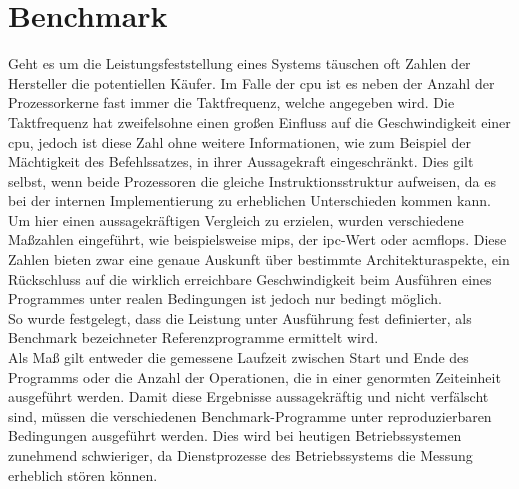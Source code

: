 \section{Benchmark}\label{kap:benchmark}
Geht es um die Leistungsfeststellung eines Systems täuschen oft Zahlen der Hersteller die potentiellen Käufer. Im Falle der \ac{cpu} ist es neben der Anzahl der Prozessorkerne
 fast immer die Taktfrequenz, welche angegeben wird.
Die Taktfrequenz hat zweifelsohne einen großen Einfluss auf die Geschwindigkeit einer \ac{cpu}, jedoch ist diese Zahl ohne weitere Informationen, wie zum Beispiel der
Mächtigkeit des Befehlssatzes, in ihrer Aussagekraft eingeschränkt. Dies gilt selbst, wenn beide Prozessoren die gleiche Instruktionsstruktur aufweisen, da es bei der
internen Implementierung zu erheblichen Unterschieden kommen kann. \\
Um hier einen aussagekräftigen Vergleich zu erzielen, wurden verschiedene Maßzahlen eingeführt, wie beispielsweise \ac{mips}, der \ac{ipc}-Wert oder ac{mflops}. Diese
 Zahlen bieten zwar eine genaue Auskunft über bestimmte Architekturaspekte, ein Rückschluss auf die wirklich erreichbare Geschwindigkeit beim Ausführen eines Programmes
 unter realen Bedingungen ist jedoch nur bedingt möglich. \\
So wurde festgelegt, dass die Leistung unter Ausführung fest definierter, als Benchmark bezeichneter Referenzprogramme ermittelt wird.\\
 Als Maß gilt entweder die gemessene
 Laufzeit zwischen Start und Ende des Programms oder die Anzahl der Operationen, die in einer genormten Zeiteinheit ausgeführt werden. Damit diese Ergebnisse aussagekräftig
 und nicht verfälscht sind, müssen die verschiedenen Benchmark-Programme unter reproduzierbaren Bedingungen ausgeführt werden. Dies wird bei heutigen Betriebssystemen zunehmend
  schwieriger, da Dienstprozesse des Betriebssystems die Messung erheblich stören können.~\cite{benchmark}

